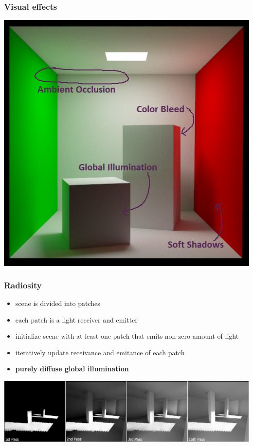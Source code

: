 \documentclass{beamer}
\begin{document}
	\begin{frame}
		\frametitle{Visual effects}
		\begin{center}
			\includegraphics[width=.7\textwidth]{img/visual_effects.png}
		\end{center}
	\end{frame}

	\begin{frame}
		\frametitle{Radiosity}
		\begin{itemize}
			\item scene is divided into patches
			\item each patch is a light receiver and emitter 
			\item initialize scene with at least one patch that emits non-zero amount of light
			\item iteratively update receivance and emitance of each patch
			\item \textbf{purely diffuse global illumination}
		\end{itemize}

		\includegraphics[width=\textwidth]{img/radiosity.png}
	\end{frame}
\end{document}
